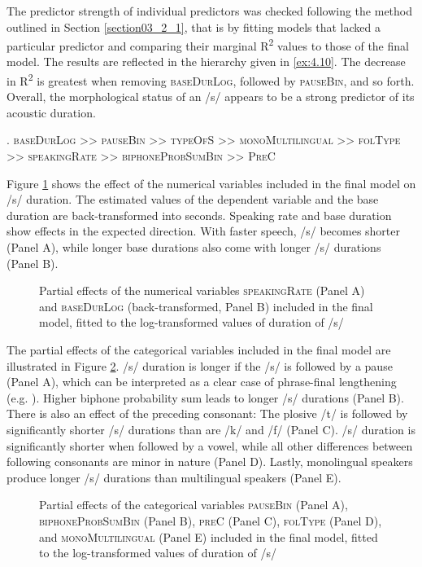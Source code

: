 The predictor strength of individual predictors was checked following the method outlined in Section \ref{section03_2_1}, that is by fitting models that lacked a particular predictor and comparing their marginal R\textsuperscript{2} values to those of the final model. The results are reflected in the hierarchy given in \ref{ex:4.10}. The decrease in R\textsuperscript{2} is greatest when removing \textsc{baseDurLog}, followed by \textsc{pauseBin}, and so forth. Overall, the morphological status of an /s/ appears to be a strong predictor of its acoustic duration.

\ex.
\label{ex:4.10}
\textsc{baseDurLog >> pauseBin >> typeOfS >> monoMultilingual >> folType >> speakingRate >> biphoneProbSumBin >> PreC}

Figure \ref{fig:4_4} shows the effect of the numerical variables included in the final model on /s/ duration. The estimated values of the dependent variable and the base duration are back-transformed into seconds. Speaking rate and base duration show effects in the expected direction. With faster speech, /s/ becomes shorter (Panel A), while longer base durations also come with longer /s/ durations (Panel B). 

\begin{figure}
    \centering
    
    \caption{Partial effects of the numerical variables \textsc{speakingRate} (Panel A) and \textsc{baseDurLog} (back-transformed, Panel B) included in the final model, fitted to the log-transformed values of duration of /s/}
    \label{fig:4_4}
\end{figure}


The partial effects of the categorical variables included in the final model are illustrated in Figure \ref{fig:4_5}. /s/ duration is longer if the /s/ is followed by a pause (Panel A), which can be interpreted as a clear case of phrase-final lengthening (e.g. \cite{Cooper1981}). Higher biphone probability sum leads to longer /s/ durations (Panel B). There is also an effect of the preceding consonant: The plosive /t/ is followed by significantly shorter /s/ durations than are /k/ and /f/ (Panel C). /s/ duration is significantly shorter when followed by a vowel, while all other differences between following consonants are minor in nature (Panel D). Lastly, monolingual speakers produce longer /s/ durations than multilingual speakers (Panel E).

\begin{figure}
    \centering
    
    \caption{Partial effects of the categorical variables \textsc{pauseBin} (Panel A), \textsc{biphoneProbSumBin} (Panel B), \textsc{preC} (Panel C), \textsc{folType} (Panel D), and \textsc{monoMultilingual} (Panel E) included in the final model, fitted to the log-transformed values of duration of /s/}
    \label{fig:4_5}
\end{figure}

